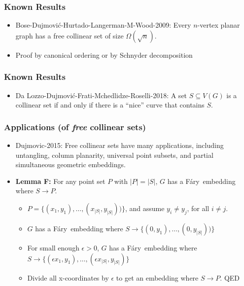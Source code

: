 \documentclass[xcolor=dvipsnames]{beamer}
\newcommand{\Fary}{F\'ary}
\begin{document}
\begin{frame}
   \frametitle{Known Results}
   \begin{itemize}
      \item<+-> Bose-Dujmovi\'c-Hurtado-Langerman-M-Wood-2009: Every
      $n$-vertex planar graph has a free collinear set of size
      $\Omega(\sqrt{n})$.
      \item<+-> Proof by canonical ordering or by Schnyder decomposition
   \end{itemize}
\end{frame}


\begin{frame}
   \frametitle{Known Results}
   \begin{itemize}
      \item<+->Da Lozzo-Dujmovi\'c-Frati-Mchedlidze-Roselli-2018:
      A set $S\subseteq V(G)$ is a collinear set if and only if there is a ``nice''
      curve that contains $S$.\\



   \end{itemize}
\end{frame}

\begin{frame}
   \frametitle{Applications (of \emph{free} collinear sets)}

   \begin{itemize}
      \item<+-> Dujmovic-2015: Free collinear sets have many applications, including untangling, column planarity, universal point subsets, and partial simultaneous geometric embeddings.
      \item<+->\textbf{Lemma F:} For any point set $P$ with $|P|=|S|$, $G$ has a \Fary\ embedding where $S\to P$.
      \begin{itemize}
        \item<+-> $P=\{(x_1,y_1),\ldots,(x_{|S|},y_{|S|}))\}$, and assume $y_i\neq y_j$, for all $i\neq j$.
        \item<+-> $G$ has a \Fary\ embedding where $S\to \{(0,y_1),\ldots,(0,y_{|S|}))\}$
        \item<+-> For small enough $\epsilon >0$,  $G$ has a \Fary\ embedding where
          $S\to \{(\epsilon x_1,y_1),\ldots,(\epsilon x_{|S|},y_{|S|})\}$
        \item<+-> Divide all x-coordinates by $\epsilon$ to get an embedding where $S\to P$. \hfill{QED} 
      \end{itemize}
   \end{itemize}
\end{frame}
 
\end{document}

